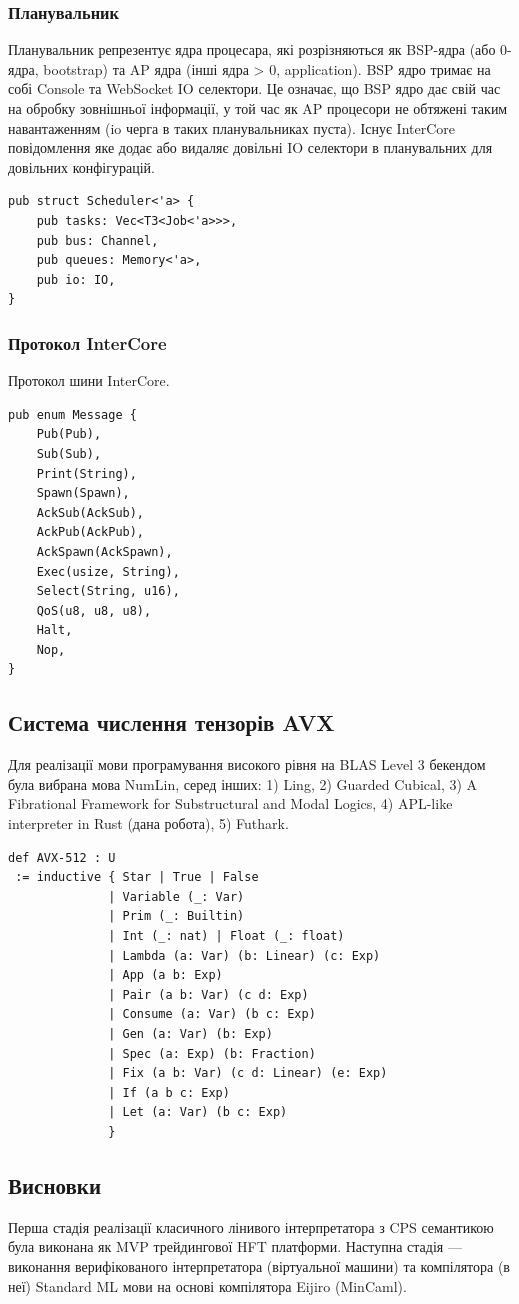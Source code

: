 \documentclass{article}
\begin{document}
\subsubsection{Планувальник}
Планувальник репрезентує ядра процесара,
які розрізняються як BSP-ядра (або 0-ядра, bootstrap)
та AP ядра (інші ядра > 0, application). BSP ядро
тримає на собі Console та WebSocket IO селектори.
Це означає, що BSP ядро дає свій час на обробку зовнішньої інформації,
у той час як AP процесори не обтяжені
таким навантаженням (io черга в таких планувальниках пуста).
Існує InterCore повідомлення яке додає або видаляє довільні IO селектори
в планувальних для довільних конфігурацій.

\begin{lstlisting}
pub struct Scheduler<'a> {
    pub tasks: Vec<T3<Job<'a>>>,
    pub bus: Channel,
    pub queues: Memory<'a>,
    pub io: IO,
}
\end{lstlisting}

\newpage
\subsubsection{Протокол InterCore}
Протокол шини InterCore.

\begin{lstlisting}
pub enum Message {
    Pub(Pub),
    Sub(Sub),
    Print(String),
    Spawn(Spawn),
    AckSub(AckSub),
    AckPub(AckPub),
    AckSpawn(AckSpawn),
    Exec(usize, String),
    Select(String, u16),
    QoS(u8, u8, u8),
    Halt,
    Nop,
}
\end{lstlisting}

\subsection{Система числення тензорів AVX}
Для реалізації мови програмування високого рівня на BLAS Level 3 бекендом
була вибрана мова NumLin, серед інших: 1) Ling, 2) Guarded Cubical,
3) A Fibrational Framework for Substructural and Modal Logics,
4) APL-like interpreter in Rust (дана робота), 5) Futhark.

\begin{lstlisting}
def AVX-512 : U
 := inductive { Star | True | False
              | Variable (_: Var)
              | Prim (_: Builtin)
              | Int (_: nat) | Float (_: float)
              | Lambda (a: Var) (b: Linear) (c: Exp)
              | App (a b: Exp)
              | Pair (a b: Var) (c d: Exp)
              | Consume (a: Var) (b c: Exp)
              | Gen (a: Var) (b: Exp)
              | Spec (a: Exp) (b: Fraction)
              | Fix (a b: Var) (c d: Linear) (e: Exp)
              | If (a b c: Exp)
              | Let (a: Var) (b c: Exp)
              }
\end{lstlisting}

\subsection{Висновки}
Перша стадія реалізації класичного лінивого інтерпретатора з CPS семантикою
була виконана як MVP трейдингової HFT платформи. Наступна стадія — виконання
верифікованого інтерпретатора (віртуальної машини) та компілятора (в неї) Standard ML мови на
основі компілятора Eijiro (MinCaml).
\end{document}
